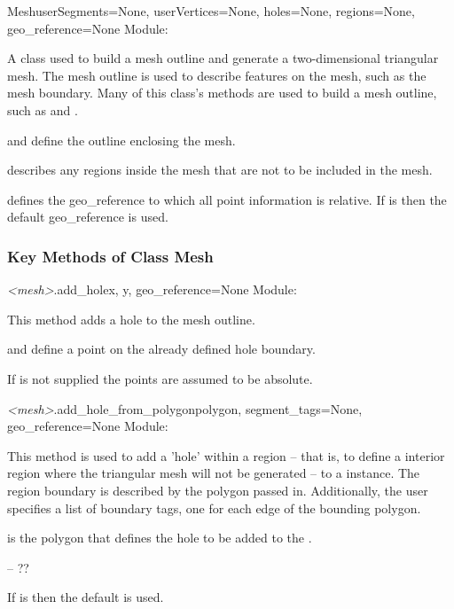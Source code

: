\documentclass{manual}
\begin{document}
\begin{classdesc}{Mesh}{userSegments=None,
                        userVertices=None,
                        holes=None,
                        regions=None,
                        geo_reference=None}
Module: 

A class used to build a mesh outline and generate a two-dimensional
triangular mesh. The mesh outline is used to describe features on the
mesh, such as the mesh boundary. Many of this class's methods are used
to build a mesh outline, such as  and
.

 and  define the outline enclosing the mesh.

 describes any regions inside the mesh that are not to be included in the mesh.

 defines the geo_reference to which all point information is relative.
If  is  then the default geo_reference is used.
\end{classdesc}

\subsubsection{Key Methods of Class Mesh}

\begin{methoddesc}{\emph{<mesh>}.add_hole}{x, y, geo_reference=None}
Module: 

This method adds a hole to the mesh outline.

 and  define a point on the already defined hole boundary.

If  is not supplied the points are assumed to be absolute.
\end{methoddesc}

\begin{methoddesc}{\emph{<mesh>}.add_hole_from_polygon}{polygon,
                                                        segment_tags=None,
                                                        geo_reference=None}
Module: 

This method is used to add a 'hole' within a region -- that is, to
define a interior region where the triangular mesh will not be
generated -- to a  instance. The region boundary is described by
the polygon passed in.  Additionally, the user specifies a list of
boundary tags, one for each edge of the bounding polygon.

 is the polygon that defines the hole to be added to the .

 -- ??

If  is  then the default  is used.
\end{methoddesc}
\end{document}
